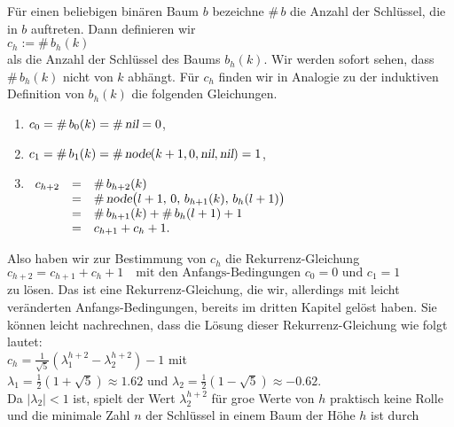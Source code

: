 F\"ur einen beliebigen bin\"aren Baum $b$ bezeichne $\#\,b$ die Anzahl der Schl\"ussel, die in
$b$ auftreten.  Dann definieren wir 
\\[0.2cm]
\hspace*{1.3cm}
$c_h := \#\, b_h(k)$
\\[0.2cm]
als die Anzahl der Schl\"ussel des Baums $b_h(k)$.  Wir werden sofort sehen, dass
$\#\,b_h(k)$ nicht von $k$ abh\"angt.  F\"ur $c_h$ finden wir in Analogie zu
der induktiven Definition von $b_h(k)$ die folgenden Gleichungen.
\begin{enumerate}
\item $c_0 = \#\, b_0(k) = \#\, \textsl{nil} = 0$,
\item $c_1 = \#\, b_1(k) = \#\, \textsl{node}(k+1,0,\textsl{nil}, \textsl{nil}) = 1$, 
\item$\begin{array}[t]{lcl}
       c_{h+2} & = & \#\, b_{h+2}(k) \\
               & = & \#\,\textsl{node}\bigl(l+1,\,0,\,b_{h+1}(k),\,b_h(l+1)\bigr) \\
               & = & \#\, b_{h+1}(k) + \#\, b_h(l+1) + 1 \\
               & = & c_{h+1} + c_h + 1.
       \end{array}$
\end{enumerate}
Also haben wir zur Bestimmung von $c_h$ die Rekurrenz-Gleichung
\\[0.2cm]
\hspace*{1.3cm}
$c_{h+2} = c_{h+1} + c_h + 1 \quad \mbox{mit den Anfangs-Bedingungen $c_0 = 0$ und $c_1 = 1$}$
\\[0.2cm]
zu l\"osen.  Das ist eine Rekurrenz-Gleichung,
die wir, allerdings mit leicht ver\"anderten Anfangs-Bedingungen, bereits im dritten Kapitel gel\"ost haben.
Sie k\"onnen leicht nachrechnen, dass die L\"osung dieser Rekurrenz-Gleichung wie folgt
lautet: 
\\[0.2cm]
\hspace*{1.3cm}
$c_h = \displaystyle \frac{1}{\sqrt{5}} \left( \lambda_1^{h+2} - \lambda_2^{h+2} \right) -
1$  \quad mit
\\[0.2cm]
\hspace*{1.3cm}
$\lambda_1 = \displaystyle \frac{1}{2}(1 + \sqrt{5}) \approx  1.62$ \quad und \quad $\lambda_2 =
\displaystyle \frac{1}{2}(1 - \sqrt{5}) \approx -0.62$.
\\[0.2cm]
Da $|\lambda_2| < 1$ ist, spielt der Wert $\displaystyle\lambda_2^{h+2}$
f\"ur gro\3e Werte von $h$   praktisch keine Rolle und die
minimale Zahl $n$ der Schl\"ussel in einem Baum der H\"ohe $h$ ist durch \\[0.2cm]
